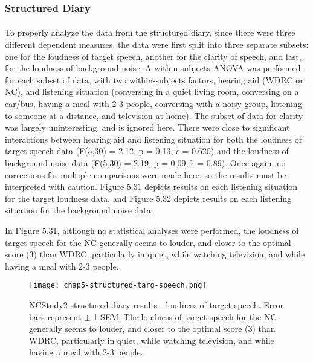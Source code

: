 \subsubsection{Structured Diary}
\paragraph{}To properly analyze the data from the structured diary, since there were three different dependent measures, the data were first split into three separate subsets: one for the loudness of target speech, another for the clarity of speech, and last, for the loudness of background noise.  A within-subjects ANOVA was performed for each subset of data, with two within-subjects factors, hearing aid (WDRC or NC), and listening situation (conversing in a quiet living room, conversing on a car/bus, having a meal with 2-3 people, conversing with a noisy group, listening to someone at a distance, and television at home).  The subset of data for clarity was largely uninteresting, and is ignored here. There were close to significant interactions between hearing aid and listening situation for both the loudness of target speech data (F(5,30) = 2.12, p = 0.13, $\tilde{\epsilon}$ = 0.620) and the loudness of background noise data (F(5,30) = 2.19, p = 0.09, $\tilde{\epsilon}$ = 0.89).  Once again, no corrections for multiple comparisons were made here, so the results must be interpreted with caution.  Figure 5.31 depicts results on each listening situation for the target loudness data, and Figure 5.32 depicts results on each listening situation for the background noise data.

In Figure 5.31, although no statistical analyses were performed, the loudness of target speech for the NC generally seems to louder, and closer to the optimal score (3) than WDRC, particularly in quiet, while watching television, and while having a meal with 2-3 people.

\begin{figure}[htp]
\begin{center}
\texttt{[image: chap5-structured-targ-speech.png]} \\
\caption[NCStudy2 structured diary results - loudness of target speech]{NCStudy2 structured diary results - loudness of target speech.  Error bars represent $\pm$ 1 SEM.  The loudness of target speech for the NC generally seems to louder, and closer to the optimal score (3) than WDRC, particularly in quiet, while watching television, and while having a meal with 2-3 people.}
\label{chap5-struct-back-noise}
\end{center}
\end{figure}

